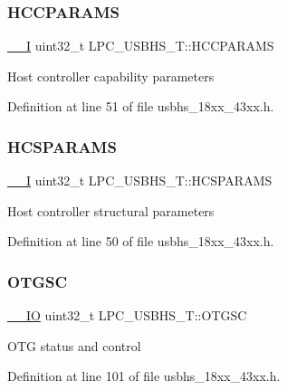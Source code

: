 \subsubsection{\texorpdfstring{H\+C\+C\+P\+A\+R\+A\+MS}{HCCPARAMS}}
{\footnotesize\ttfamily \hyperlink{core__sc300_8h_af63697ed9952cc71e1225efe205f6cd3}{\+\_\+\+\_\+I} uint32\+\_\+t L\+P\+C\+\_\+\+U\+S\+B\+H\+S\+\_\+\+T\+::\+H\+C\+C\+P\+A\+R\+A\+MS}

Host controller capability parameters 

Definition at line 51 of file usbhs\+\_\+18xx\+\_\+43xx.\+h.

\mbox{\label{struct_l_p_c___u_s_b_h_s___t_ae09874c8039d5b773c55b90d4b55c4a1}} 
\subsubsection{\texorpdfstring{H\+C\+S\+P\+A\+R\+A\+MS}{HCSPARAMS}}
{\footnotesize\ttfamily \hyperlink{core__sc300_8h_af63697ed9952cc71e1225efe205f6cd3}{\+\_\+\+\_\+I} uint32\+\_\+t L\+P\+C\+\_\+\+U\+S\+B\+H\+S\+\_\+\+T\+::\+H\+C\+S\+P\+A\+R\+A\+MS}

Host controller structural parameters 

Definition at line 50 of file usbhs\+\_\+18xx\+\_\+43xx.\+h.

\mbox{\label{struct_l_p_c___u_s_b_h_s___t_a9013f74a76e555075d835d82d45f9685}} 
\subsubsection{\texorpdfstring{O\+T\+G\+SC}{OTGSC}}
{\footnotesize\ttfamily \hyperlink{core__sc300_8h_aec43007d9998a0a0e01faede4133d6be}{\+\_\+\+\_\+\+IO} uint32\+\_\+t L\+P\+C\+\_\+\+U\+S\+B\+H\+S\+\_\+\+T\+::\+O\+T\+G\+SC}

O\+TG status and control 

Definition at line 101 of file usbhs\+\_\+18xx\+\_\+43xx.\+h.

